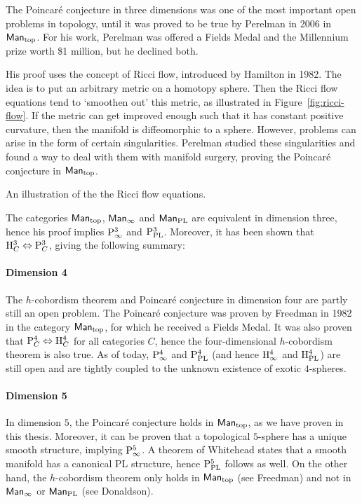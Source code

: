 The Poincaré conjecture in three dimensions was one of the most important open problems in topology, until it was proved to be true by Perelman in 2006 in $\textsf{Man}_{\text{top}}$.
For his work, Perelman was offered a Fields Medal and the Millennium prize worth \$1 million, but he declined both.

His proof uses the concept of Ricci flow, introduced by Hamilton in 1982.
The idea is to put an arbitrary metric on a homotopy sphere.
Then the Ricci flow equations tend to `smoothen out' this metric, as illustrated in Figure~\ref{fig:ricci-flow}.
If the metric can get improved enough such that it has constant positive curvature, then the manifold is diffeomorphic to a sphere.
However, problems can arise in the form of certain singularities.
Perelman studied these singularities and found a way to deal with them with manifold surgery, proving the Poincaré conjecture in $\textsf{Man}_{\text{top}}$.
\begin{marginfigure}
    \centering
    \caption{An illustration of the the Ricci flow equations.}
    \label{fig:ricci-flow}
\end{marginfigure}
The categories $\textsf{Man}_{\text{top}}$,  $\textsf{Man}_{\infty}$ and  $\textsf{Man}_{\text{PL}}$ are equivalent in dimension three, hence his proof implies $\mathrm P_{\infty}^{3}$ and  $\mathrm P_{\text{PL}}^{3}$.
Moreover, it has been shown that $\mathrm H_{C}^{3} \Leftrightarrow \mathrm P_{C}^{3}$, giving the following summary:




\paragraph{Dimension 4}
The $h$-cobordism theorem and Poincaré conjecture in dimension four are partly still an open problem.
The Poincaré conjecture was proven by Freedman in 1982 in the category $\textsf{Man}_{\text{top}}$, for which he received a Fields Medal.
It was also proven that $\mathrm P_{C}^{4} \Leftrightarrow \mathrm H_{C}^{4}$ for all categories $C$, hence the four-dimensional $h$-cobordism theorem is also true.
As of today, $\mathrm P_{\infty}^{4}$ and $\mathrm P_{\text{PL}}^{4}$ (and hence $\mathrm H_{\infty}^{4}$ and  $\mathrm H_{\text{PL}}^{4}$) are still open and are tightly coupled to the unknown existence of exotic $4$-spheres.



\paragraph{Dimension 5}
In dimension $5$, the  Poincaré conjecture holds in $\textsf{Man}_{\text{top}}$, as we have proven in this thesis.
Moreover, it can be proven that a topological $5$-sphere has a unique smooth structure, implying $\mathrm P_{\infty}^{5}$.
A theorem of Whitehead states that a smooth manifold has a canonical PL structure, hence  $\mathrm P_{\text{PL}}^{5}$ follows as well.
On the other hand, the $h$-cobordism theorem only holds in $\textsf{Man}_{\text{top}}$ (see Freedman) and not in $\textsf{Man}_{\infty}$ or $\textsf{Man}_{\text{PL}}$ (see Donaldson).



